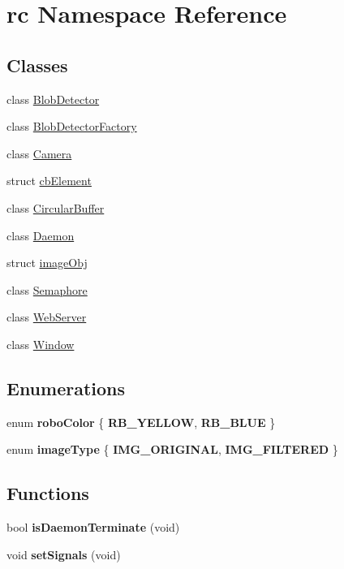 \hypertarget{namespacerc}{\section{rc Namespace Reference}
\label{namespacerc}
}
\subsection*{Classes}
\begin{DoxyCompactItemize}
\item 
class \hyperlink{classrc_1_1BlobDetector}{Blob\+Detector}
\item 
class \hyperlink{classrc_1_1BlobDetectorFactory}{Blob\+Detector\+Factory}
\item 
class \hyperlink{classrc_1_1Camera}{Camera}
\item 
struct \hyperlink{structrc_1_1cbElement}{cb\+Element}
\item 
class \hyperlink{classrc_1_1CircularBuffer}{Circular\+Buffer}
\item 
class \hyperlink{classrc_1_1Daemon}{Daemon}
\item 
struct \hyperlink{structrc_1_1imageObj}{image\+Obj}
\item 
class \hyperlink{classrc_1_1Semaphore}{Semaphore}
\item 
class \hyperlink{classrc_1_1WebServer}{Web\+Server}
\item 
class \hyperlink{classrc_1_1Window}{Window}
\end{DoxyCompactItemize}
\subsection*{Enumerations}
\begin{DoxyCompactItemize}
\item 
\hypertarget{namespacerc_a79a656935f516f1a4339ad99f367934b}{enum {\bfseries robo\+Color} \{ {\bfseries R\+B\+\_\+\+Y\+E\+L\+L\+O\+W}, 
{\bfseries R\+B\+\_\+\+B\+L\+U\+E}
 \}}\label{namespacerc_a79a656935f516f1a4339ad99f367934b}

\item 
\hypertarget{namespacerc_a7be67fa6e9ec3e19fcc2df0777ab42fe}{enum {\bfseries image\+Type} \{ {\bfseries I\+M\+G\+\_\+\+O\+R\+I\+G\+I\+N\+A\+L}, 
{\bfseries I\+M\+G\+\_\+\+F\+I\+L\+T\+E\+R\+E\+D}
 \}}\label{namespacerc_a7be67fa6e9ec3e19fcc2df0777ab42fe}

\end{DoxyCompactItemize}
\subsection*{Functions}
\begin{DoxyCompactItemize}
\item 
\hypertarget{namespacerc_a793e3f430d5b5c99fe110a6a14ffcc6b}{bool {\bfseries is\+Daemon\+Terminate} (void)}\label{namespacerc_a793e3f430d5b5c99fe110a6a14ffcc6b}

\item 
\hypertarget{namespacerc_a394315bf537365634692ccb2bc32b287}{void {\bfseries set\+Signals} (void)}\label{namespacerc_a394315bf537365634692ccb2bc32b287}

\end{DoxyCompactItemize}


